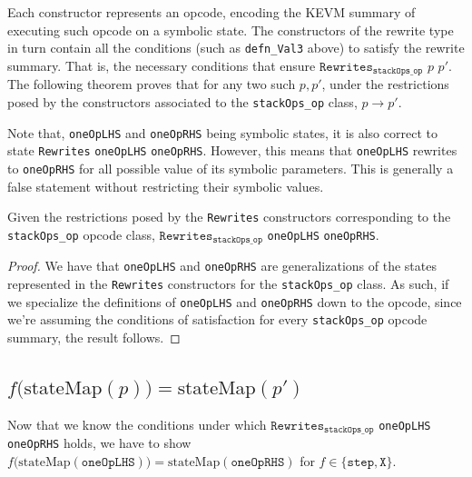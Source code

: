 Each constructor represents an opcode, encoding the KEVM summary of executing such
opcode on a symbolic state. The constructors of the rewrite type in turn contain
all the conditions (such as \texttt{defn_Val3} above) to satisfy the rewrite
summary. That is, the necessary conditions that ensure
$\texttt{Rewrites}_{\texttt{stackOps_op}}\,\, p \,\, p'$. The following theorem
proves that for any two such $p, p'$, under the restrictions posed by the
constructors associated to the \texttt{stackOps_op} class, $p\rightarrow p'$.

Note that, \texttt{oneOpLHS} and \texttt{oneOpRHS} being symbolic states, it is
also correct to state \texttt{Rewrites} \texttt{oneOpLHS} \texttt{oneOpRHS}.
However, this means that \texttt{oneOpLHS} rewrites to \texttt{oneOpRHS} for all
possible value of its symbolic parameters. This is generally a false statement
without restricting their symbolic values.

\begin{theorem}\label{thm:oneOpRw}
\leanok
{}

Given the restrictions posed by the \texttt{Rewrites} constructors corresponding
to the \texttt{stackOps_op} opcode class,
$\texttt{Rewrites}_{\texttt{stackOps_op}}$ \texttt{oneOpLHS} \texttt{oneOpRHS}.

\end{theorem}

\begin{proof}
\leanok

We have that \texttt{oneOpLHS} and \texttt{oneOpRHS} are generalizations of the
states represented in the \texttt{Rewrites} constructors for the
\texttt{stackOps_op} class. As such, if we specialize the definitions of
\texttt{oneOpLHS} and \texttt{oneOpRHS} down to the opcode, since we're assuming
the conditions of satisfaction for every \texttt{stackOps_op} opcode summary,
the result follows.

\end{proof}

\subsection{$f\bigl(\text{stateMap}(p)\bigr) = \text{stateMap}(p')$}

Now that we know the conditions under which
$\texttt{Rewrites}_{\texttt{stackOps_op}}$ \texttt{oneOpLHS} \texttt{oneOpRHS} holds,
we have to show $f\bigl(\text{stateMap}(\texttt{oneOpLHS})\bigr) =
\text{stateMap}(\texttt{oneOpRHS})$ for $f\in\{\texttt{step}, \texttt{X}\}$.

